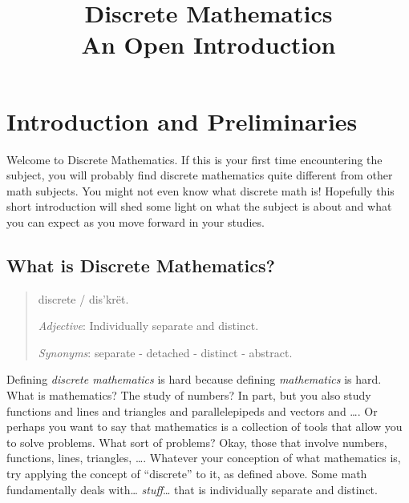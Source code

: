 \documentclass[10pt,]{book}
\title{Discrete Mathematics\\
{\large An Open Introduction}}
\author{}
\date{}
\theoremstyle{plain}
\theoremstyle{definition}
\theoremstyle{definition}
\theoremstyle{definition}
\begin{document}
\typeout{************************************************}
\typeout{************************************************}
\chapter[Introduction and Preliminaries]{Introduction and Preliminaries}\label{ch_intro}
\typeout{************************************************}
\typeout{************************************************}

      Welcome to Discrete Mathematics. If this is your first time encountering the subject, you will probably find discrete mathematics quite different from other math subjects. You might not even know what discrete math is! Hopefully this short introduction
      will shed some light on what the subject is about and what you can expect as you move forward in your studies.
\typeout{************************************************}
\typeout{************************************************}
\section[What is Discrete Mathematics?]{What is Discrete Mathematics?}\label{sec_intro-intro}
\begin{quote}dis\textperiodcentered{}crete / dis'krët.%
\par
 \emph{Adjective}: Individually separate and distinct.%
\par
\emph{Synonyms}: separate - detached - distinct - abstract.%
\end{quote}

    Defining \emph{discrete mathematics} is hard because defining \emph{mathematics} is hard. What is mathematics? The study of numbers? In part, but you also study functions and lines and triangles and parallelepipeds and vectors and
    \dots{}. Or perhaps you want to say that mathematics is a collection of tools that allow you to solve problems. What sort of problems? Okay, those that involve numbers, functions, lines, triangles,
    \dots{}. Whatever your conception of what mathematics is, try applying the concept of ``discrete'' to it, as defined above. Some math fundamentally deals with\dots{} \emph{stuff}\dots{} that is individually separate and distinct.
\par
\end{document}
